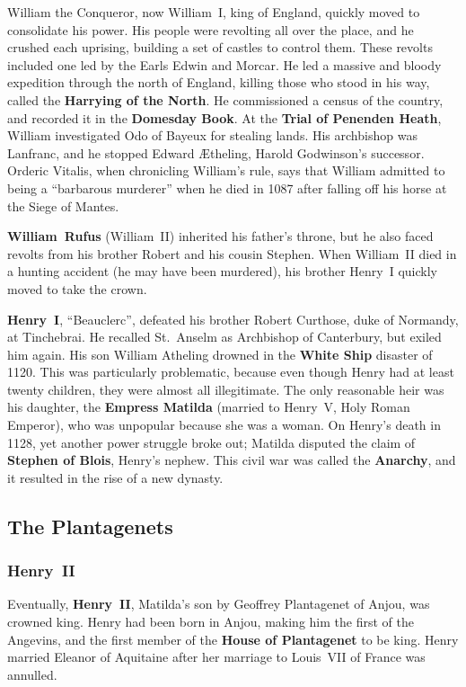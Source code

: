 William the Conqueror, now William~I, king of England, quickly moved to consolidate his power.
His people were revolting all over the place, and he crushed each uprising,
building a set of castles to control them.
These revolts included one led by the Earls Edwin and Morcar.
He led a massive and bloody expedition through the north of England,
killing those who stood in his way, called the \textbf{Harrying of the North}.
He commissioned a census of the country, and recorded it in the \textbf{Domesday Book}.
At the \textbf{Trial of Penenden Heath}, William investigated Odo of Bayeux for stealing lands.
His archbishop was Lanfranc, and he stopped Edward \AE{}theling, Harold Godwinson's successor.
Orderic Vitalis, when chronicling William's rule, says that William admitted to being a ``barbarous murderer''
when he died in 1087 after falling off his horse at the Siege of Mantes.

\textbf{William~Rufus} (William~II) inherited his father's throne,
but he also faced revolts from his brother Robert and his cousin Stephen.
When William~II died in a hunting accident (he may have been murdered),
his brother Henry~I quickly moved to take the crown.

\textbf{Henry~I}, ``Beauclerc'',
defeated his brother Robert Curthose, duke of Normandy, at Tinchebrai.
He recalled St.\ Anselm as Archbishop of Canterbury, but exiled him again.
His son William Atheling drowned in the \textbf{White Ship} disaster of 1120.
This was particularly problematic,
because even though Henry had at least twenty children, they were almost all illegitimate.
The only reasonable heir was his daughter,
the \textbf{Empress Matilda} (married to Henry~V, Holy Roman Emperor),
who was unpopular because she was a woman.
On Henry's death in 1128, yet another power struggle broke out;
Matilda disputed the claim of \textbf{Stephen of Blois}, Henry's nephew.
This civil war was called the \textbf{Anarchy}, and it resulted in the rise of a new dynasty.

\subsection*{The Plantagenets}

\subsubsection*{Henry~II}

Eventually, \textbf{Henry~II}, Matilda's son by Geoffrey Plantagenet of Anjou, was crowned king.
Henry had been born in Anjou, making him the first of the Angevins,
and the first member of the \textbf{House of Plantagenet} to be king.
Henry married Eleanor of Aquitaine after her marriage to Louis~VII of France was annulled.

